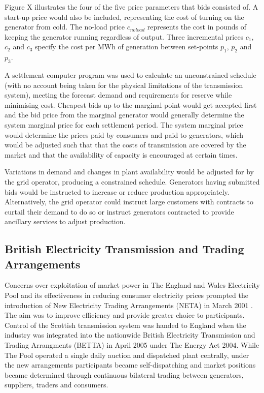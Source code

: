 
Figure X illustrates the four of the five price parameters that bids consisted
of.  A start-up price would also be included, representing the cost of turning
on the generator from cold.  The no-load price $c_{noload}$ represents the
cost in pounds of keeping the generator running regardless of output. Three
incremental prices $c_1$, $c_2$ and $c_3$ specify the cost per MWh of
generation between set-points $p_1$, $p_2$ and $p_3$.

A settlement computer program was used to calculate an unconstrained schedule
(with no account being taken for the physical limitations of the transmission
system), meeting the forecast demand and requirements for reserve while minimising cost.
Cheapest bids up to the marginal point would get accepted first and the bid
price from the marginal generator would generally determine the system marginal
price for each settlement period.  The system marginal price would determine
the prices paid by consumers and paid to generators, which would be adjusted
such that that the costs of transmission are covered by the market and that the
availability of capacity is encouraged at certain times.

Variations in demand and changes in plant availability would be adjusted for by
the grid operator, producing a constrained schedule.  Generators having
submitted bids would be instructed to increase or reduce production
appropriately.  Alternatively, the grid operator could instruct large customers
with contracts to curtail their demand to do so or instruct generators
contracted to provide ancillary services to adjust production.

\subsection{British Electricity Transmission and Trading Arrangements}
\label{sec:betta}
Concerns over exploitation of market power in The England and Wales Electricity
Pool and its effectiveness in reducing consumer electricity prices prompted the
introduction of New Electricity Trading Arrangements (NETA) in March 2001
\cite{martoccia:2005}.  The aim was to improve efficiency and provide greater
choice to participants.  Control of the Scottish transmission system was
handed to England when the industry was integrated into the nationwide British
Electricity Transmission and Trading Arrangments (BETTA) in April 2005 under The Energy
Act 2004.  While The Pool operated a single daily auction and dispatched
plant centrally, under the new arrangements participants became
self-dispatching and market positions became determined through continuous
bilateral trading between generators, suppliers, traders and consumers.

